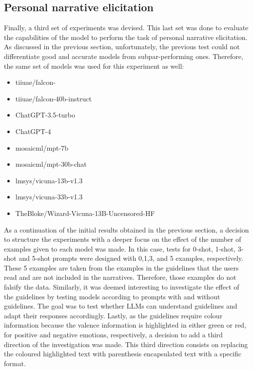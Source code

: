 \subsection{Personal narrative elicitation}
\label{cha:methodology-personal-narrative-elicitation}
Finally, a third set of experiments was devised. This last set was done to evaluate the capabilities of the model to perform the task of personal narrative elicitation.
As discussed in the previous section, unfortunately, the previous test could not differentiate good and accurate models from subpar-performing ones. Therefore, the same set of models was used for this experiment as well:
\begin{itemize}
    \item   tiiuae/falcon- \cite{falcon40b}
    \item   tiiuae/falcon-40b-instruct \cite{falcon40b}
    \item   ChatGPT-3.5-turbo \cite{chatgpt}
    \item   ChatGPT-4 \cite{openai2023gpt4}
    \item   mosaicml/mpt-7b \cite{mpt7b}
    \item   mosaicml/mpt-30b-chat \cite{mpt30b}
    \item   lmsys/vicuna-13b-v1.3 \cite{touvronllama}
    \item   lmsys/vicuna-33b-v1.3 \cite{touvronllama}
    \item   TheBloke/Wizard-Vicuna-13B-Uncensored-HF \cite{wizard-vicuna}
\end{itemize}
As a continuation of the initial results obtained in the previous section, a decision to structure the experiments with a deeper focus on the effect of the number of examples given to each model was made. In this case, tests for 0-shot, 1-shot, 3-shot and 5-shot prompts were designed with 0,1,3, and 5 examples, respectively. These 5 examples are taken from the examples in the guidelines that the users read and are not included in the narratives. Therefore, those examples do not falsify the data. Similarly, it was deemed interesting to investigate the effect of the guidelines by testing models according to prompts with and without guidelines. The goal was to test whether LLMs can understand guidelines and adapt their responses accordingly. Lastly, as the guidelines require colour information because the valence information is highlighted in either green or red, for positive and negative emotions, respectively, a decision to add a third direction of the investigation was made. This third direction consists on replacing the coloured highlighted text with parenthesis encapsulated text with a specific format.
